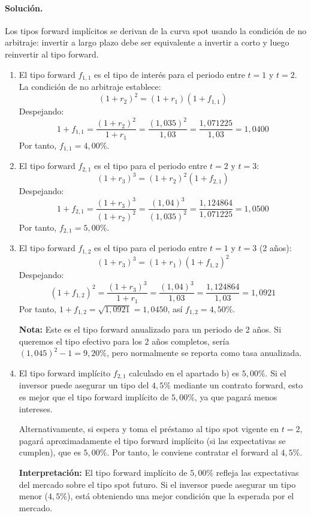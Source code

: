 \documentclass[12pt,a4paper]{article}
\newenvironment{solucion}{\paragraph{Solución.}}{}
\begin{document}
 \begin{solucion}
 Los tipos forward implícitos se derivan de la curva spot usando la condición de no arbitraje: invertir a largo plazo debe ser equivalente a invertir a corto y luego reinvertir al tipo forward.
 \begin{enumerate}[label=\alph*)]
   \item El tipo forward \(f_{1,1}\) es el tipo de interés para el periodo entre \(t=1\) y \(t=2\). La condición de no arbitraje establece:
   \[
   (1+r_2)^2 = (1+r_1)(1+f_{1,1})
   \]
   Despejando:
   \[
   1+f_{1,1} = \frac{(1+r_2)^2}{1+r_1} = \frac{(1{,}035)^2}{1{,}03} = \frac{1{,}071225}{1{,}03} = 1{,}0400
   \]
   Por tanto, \(f_{1,1} = 4{,}00\%\).
   
   \item El tipo forward \(f_{2,1}\) es el tipo para el periodo entre \(t=2\) y \(t=3\):
   \[
   (1+r_3)^3 = (1+r_2)^2(1+f_{2,1})
   \]
   Despejando:
   \[
   1+f_{2,1} = \frac{(1+r_3)^3}{(1+r_2)^2} = \frac{(1{,}04)^3}{(1{,}035)^2} = \frac{1{,}124864}{1{,}071225} = 1{,}0500
   \]
   Por tanto, \(f_{2,1} = 5{,}00\%\).
   
   \item El tipo forward \(f_{1,2}\) es el tipo para el periodo entre \(t=1\) y \(t=3\) (2 años):
   \[
   (1+r_3)^3 = (1+r_1)(1+f_{1,2})^2
   \]
   Despejando:
   \[
   (1+f_{1,2})^2 = \frac{(1+r_3)^3}{1+r_1} = \frac{(1{,}04)^3}{1{,}03} = \frac{1{,}124864}{1{,}03} = 1{,}0921
   \]
   Por tanto, \(1+f_{1,2} = \sqrt{1{,}0921} = 1{,}0450\), así \(f_{1,2} = 4{,}50\%\).
   
   \textbf{Nota:} Este es el tipo forward anualizado para un periodo de 2 años. Si queremos el tipo efectivo para los 2 años completos, sería \((1{,}045)^2 - 1 = 9{,}20\%\), pero normalmente se reporta como tasa anualizada.
   
   \item El tipo forward implícito \(f_{2,1}\) calculado en el apartado b) es \(5{,}00\%\). Si el inversor puede asegurar un tipo del \(4{,}5\%\) mediante un contrato forward, esto es mejor que el tipo forward implícito de \(5{,}00\%\), ya que pagará menos intereses. 
   
   Alternativamente, si espera y toma el préstamo al tipo spot vigente en \(t=2\), pagará aproximadamente el tipo forward implícito (si las expectativas se cumplen), que es \(5{,}00\%\). Por tanto, le conviene contratar el forward al \(4{,}5\%\).
   
   \textbf{Interpretación:} El tipo forward implícito de \(5{,}00\%\) refleja las expectativas del mercado sobre el tipo spot futuro. Si el inversor puede asegurar un tipo menor (\(4{,}5\%\)), está obteniendo una mejor condición que la esperada por el mercado.
   

\end{enumerate}
\end{solucion}
\end{document}
